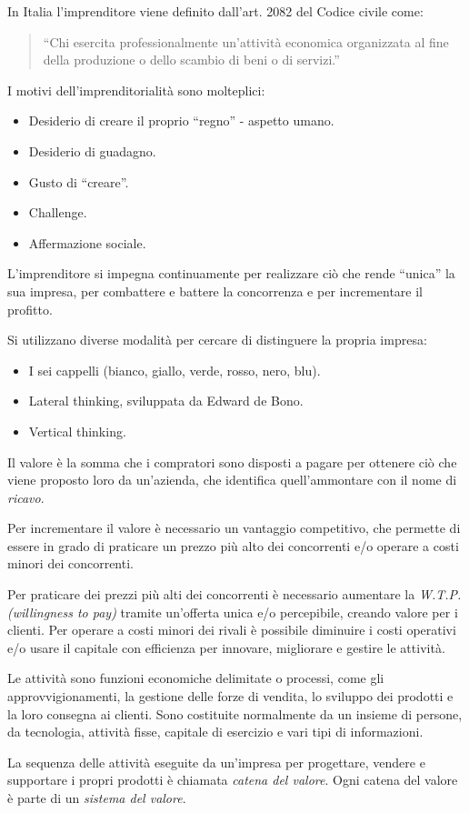 \documentclass[12pt]{article}
\begin{document}
In Italia l’imprenditore viene definito dall’art. 2082 del Codice civile come:
\begin{quote}
    ``Chi esercita professionalmente un’attività economica organizzata al fine della produzione o dello scambio di beni o di servizi.''
\end{quote}

I motivi dell’imprenditorialità sono molteplici:
\begin{itemize}
    \item Desiderio di creare il proprio ``regno'' - aspetto umano.
    \item Desiderio di guadagno.
    \item Gusto di ``creare''.
    \item Challenge.
    \item Affermazione sociale.
\end{itemize}

L’imprenditore si impegna continuamente per realizzare ciò che rende ``unica'' la sua impresa, per combattere e battere la concorrenza e per incrementare il profitto.

Si utilizzano diverse modalità per cercare di distinguere la propria impresa:
\begin{itemize}
    \item I sei cappelli (bianco, giallo, verde, rosso, nero, blu).
    \item Lateral thinking, sviluppata da Edward de Bono.
    \item Vertical thinking.
\end{itemize}

Il valore è la somma che i compratori sono disposti a pagare per ottenere ciò che viene proposto loro da un'azienda, che identifica quell’ammontare con il nome di \textit{ricavo}.

Per incrementare il valore è necessario un vantaggio competitivo, che permette di essere in grado di praticare un prezzo più alto dei concorrenti e/o operare a costi minori dei concorrenti.

Per praticare dei prezzi più alti dei concorrenti è necessario aumentare la \textit{W.T.P. (willingness to pay)} tramite un’offerta unica e/o percepibile, creando valore per i clienti. Per operare a costi minori dei rivali è possibile diminuire i costi operativi e/o usare il capitale con efficienza per innovare, migliorare e gestire le attività.

Le attività sono funzioni economiche delimitate o processi, come gli approvvigionamenti, la gestione delle forze di vendita, lo sviluppo dei prodotti e la loro consegna ai clienti. Sono costituite normalmente da un insieme di persone, da tecnologia, attività fisse, capitale di esercizio e vari tipi di informazioni.

La sequenza delle attività eseguite da un’impresa per progettare, vendere e supportare i propri prodotti è chiamata \textit{catena del valore}. Ogni catena del valore è parte di un \textit{sistema del valore}.
\end{document}
